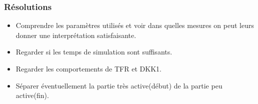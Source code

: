 
\begin{frame}[c]
  \frametitle{Résolutions}


\begin{itemize}
  \item Comprendre les paramètres utilisés et voir dans quelles mesures on peut leurs donner une interprétation satisfaisante.
  \item Regarder si les temps de simulation sont suffisants.
  \item Regarder les comportements de TFR et DKK1.
  \item Séparer éventuellement la partie très active(début) de la partie peu active(fin).
\end{itemize}


\end{frame}
